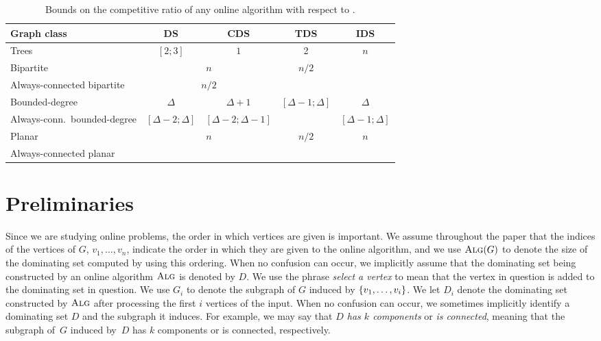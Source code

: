 \begin{table}
\begin{tabular}{|l||c|c|c|c|}
\hline
Graph class & DS & CDS & TDS & IDS \\ 
\hline\hline
Trees & $[2;3]$ & $1$ & 2 & \multirow{3}{*}{$n$}\\ 
\hhline{|----|~|}
Bipartite & \multicolumn{2}{c|}{$n$} & \multirow{2}{*}{$n/2$} & \\
\hhline{|---~|~|}
Always-connected bipartite &    \multicolumn{2}{c|}{$n/2$} & &  \\
\hline
Bounded-degree & $\Delta$ & $\Delta +1$ & \multirow{2}{*}{$[\Delta -1; \Delta]$}  &$\Delta$ \\
\hhline{|---|~|-|}
Always-conn.\ bounded-degree &$[\Delta-2;\Delta]$ & $[\Delta-2;\Delta -1]$ &  &$[\Delta -1; \Delta]$ \\
\hline
Planar & \multicolumn{2}{c|}{\multirow{2}{*}{$n$}} &\multirow{2}{*}{$n/2$} & \multirow{2}{*}{$n$}\\
\hhline{|-|~~|~|~|}
Always-connected planar & \multicolumn{2}{c|}{}  & & \\
\hline
\end{tabular}
\caption{Bounds on the competitive ratio of  any online algorithm  with respect to \offopt.\label{table:any-offopt}}
\end{table}



\section{Preliminaries}
Since we are studying online problems, the order in which vertices
are given is important. We assume throughout the paper that
the indices of the vertices of $G$, $v_1,\ldots, v_n$,
indicate the order in which they are given to the online algorithm,
and we use $\operatorname{\textsc{Alg}}(G)$ to denote the size of the dominating set
computed by \ALG using this ordering.
When no confusion can occur, we implicitly assume that the dominating
set being constructed by an online algorithm $\operatorname{\textsc{Alg}}$ is denoted by $D$. 
We use the phrase \emph{select a vertex} to mean that the vertex
in question is added to the dominating set in question.
We use $G_i$ to denote the subgraph of $G$ induced by $\left\{v_1, \ldots, v_i\right\}$.
We let $D_i$ denote
the dominating set constructed by $\operatorname{\textsc{Alg}}$ after processing the first
$i$ vertices of the input.
When no confusion can occur, we 
sometimes implicitly 
identify a dominating set $D$ and the subgraph it induces. 
For example, we may say that
\emph{$D$ has $k$ components} or \emph{is connected},
meaning that the subgraph of~$G$
induced by~$D$ has $k$ components or is connected, respectively.

